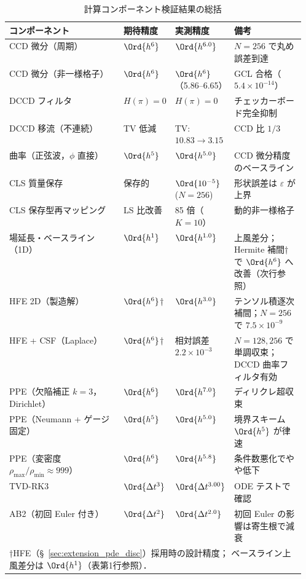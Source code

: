 \begin{table}[htbp]
\centering
\caption{計算コンポーネント検証結果の総括}
\label{tab:verification_summary}
\renewcommand{\arraystretch}{1.3}
\small
\begin{tabular}{lp{0.14\linewidth}p{0.18\linewidth}p{0.24\linewidth}}
\toprule
コンポーネント & 期待精度 & 実測精度 & 備考 \\
\midrule
CCD 微分（周期） & $\Ord{h^6}$ & $\Ord{h^{6.0}}$ & $N = 256$ で丸め誤差到達 \\
CCD 微分（非一様格子） & $\Ord{h^6}$ & $\Ord{h^6}$（5.86--6.65） & GCL 合格（$5.4 \times 10^{-14}$） \\
DCCD フィルタ   & $H(\pi) = 0$ & $H(\pi) = 0$ & チェッカーボード完全抑制 \\
DCCD 移流（不連続） & TV 低減 & TV: $10.83 \to 3.15$ & CCD 比 $1/3$ \\
曲率（正弦波，$\phi$ 直接） & $\Ord{h^5}$ & $\Ord{h^{5.0}}$ & CCD 微分精度のベースライン \\
CLS 質量保存    & 保存的     & $\Ord{10^{-5}}$ ($N=256$) & 形状誤差は $\varepsilon$ が上界 \\
CLS 保存型再マッピング & LS 比改善 & 85 倍（$K=10$） & 動的非一様格子 \\
場延長・ベースライン（1D）& $\Ord{h^1}$ & $\Ord{h^{1.0}}$ & 上風差分；Hermite 補間†で $\Ord{h^6}$ へ改善（次行参照） \\
HFE 2D（製造解） & $\Ord{h^6}$† & $\Ord{h^{3.0}}$ & テンソル積逐次補間；$N{=}256$ で $7.5 \times 10^{-9}$ \\
HFE + CSF（Laplace） & $\Ord{h^6}$† & 相対誤差 $2.2\times10^{-3}$ & $N{=}128{,}256$ で単調収束；DCCD 曲率フィルタ有効 \\
PPE（欠陥補正 $k{=}3$，Dirichlet） & $\Ord{h^6}$ & $\Ord{h^{7.0}}$ & ディリクレ超収束 \\
PPE（Neumann + ゲージ固定） & $\Ord{h^5}$ & $\Ord{h^{5.0}}$ & 境界スキーム $\Ord{h^5}$ が律速 \\
PPE（変密度 $\rho_{\max}/\rho_{\min}{\approx}999$） & $\Ord{h^6}$ & $\Ord{h^{5.8}}$ & 条件数悪化でやや低下 \\
TVD-RK3         & $\Ord{\Delta t^3}$ & $\Ord{\Delta t^{3.00}}$ & ODE テストで確認 \\
AB2（初回 Euler 付き） & $\Ord{\Delta t^2}$ & $\Ord{\Delta t^{2.0}}$ & 初回 Euler の影響は寄生根で減衰 \\
\bottomrule
\multicolumn{4}{l}{\footnotesize †HFE（§~\ref{sec:extension_pde_disc}）採用時の設計精度；
  ベースライン上風差分は $\Ord{h^1}$（表第1行参照）．} \\
\end{tabular}
\end{table}

